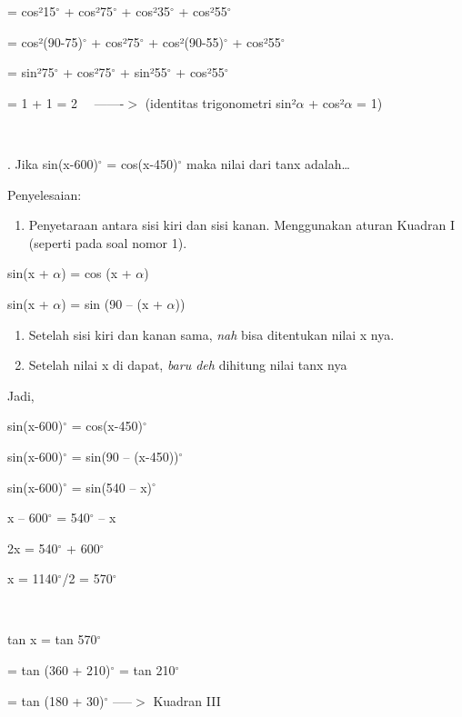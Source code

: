 \documentclass[11pt,fleqn]{book} %
\begin{document}
\noindent = cos²15${}^\circ$ + cos²75${}^\circ$ + cos²35${}^\circ$ + cos²55${}^\circ$

\noindent = cos²(90-75)${}^\circ$ + cos²75${}^\circ$ + cos²(90-55)${}^\circ$ + cos²55${}^\circ$

\noindent = sin²75${}^\circ$ + cos²75${}^\circ$ + sin²55${}^\circ$ + cos²55${}^\circ$

\noindent = 1 + 1 = 2~~ -------$>$ (identitas trigonometri sin²$\alpha$ + cos²$\alpha$ = 1)

\noindent ~

. Jika sin(x-600)${}^\circ$ = cos(x-450)${}^\circ$ maka nilai dari tanx adalah{\dots}

\noindent Penyelesaian:

\begin{enumerate}
\item  Penyetaraan antara sisi kiri dan sisi kanan. Menggunakan aturan Kuadran I (seperti pada soal nomor 1).
\end{enumerate}

\noindent sin(x + $\alpha$) = cos (x + $\alpha$)

\noindent sin(x + $\alpha$) = sin (90 -- (x + $\alpha$))

\begin{enumerate}
\item  Setelah sisi kiri dan kanan sama, \textit{nah} bisa ditentukan nilai x nya.

\item  Setelah nilai x di dapat, \textit{baru deh} dihitung nilai tanx nya
\end{enumerate}

\noindent Jadi,

\noindent sin(x-600)${}^\circ$ = cos(x-450)${}^\circ$

\noindent sin(x-600)${}^\circ$ = sin(90 -- (x-450))${}^\circ$

\noindent sin(x-600)${}^\circ$ = sin(540 -- x)${}^\circ$

\noindent x -- 600${}^\circ$ = 540${}^\circ$ -- x

\noindent 2x = 540${}^\circ$ + 600${}^\circ$

\noindent x = 1140${}^\circ$/2 = 570${}^\circ$

\noindent ~

\noindent tan x = tan 570${}^\circ$

\noindent = tan (360 + 210)${}^\circ$ = tan 210${}^\circ$

\noindent = tan (180 + 30)${}^\circ$ -----$>$ Kuadran III
\end{document}
